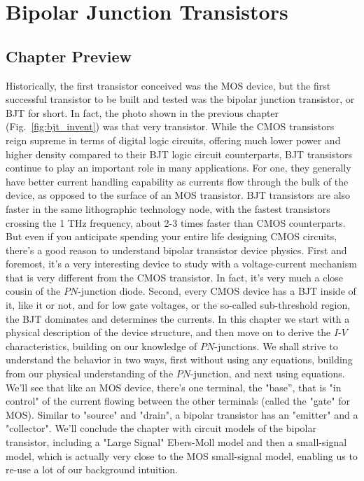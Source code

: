 \chapter{Bipolar Junction Transistors}
\label{ch:ch11_bjt}
\graphicspath{{./figs_bjt/}}
\section{Chapter Preview}
Historically, the first transistor conceived was the MOS device, but the first successful transistor to be built and tested was the bipolar junction transistor, or BJT for short.  In fact, the photo shown in the previous chapter (Fig.~\ref{fig:bjt_invent}) was that very transistor.  While the CMOS transistors reign supreme in terms of digital logic circuits, offering much lower power and higher density compared to their BJT logic circuit counterparts, BJT transistors continue to play an important role in many applications.  For one, they generally have better current handling capability as currents flow through the bulk of the device, as opposed to the surface of an MOS transistor.  BJT transistors are also faster in the same lithographic technology node, with the fastest transistors crossing the 1 THz frequency, about 2-3 times faster than CMOS counterparts.  But even if you anticipate spending your entire life designing CMOS circuits, there's a good reason to understand bipolar transistor device physics.  First and foremost, it's a very interesting device to study with a voltage-current mechanism that is very different from the CMOS transistor.  In fact, it's very much a close cousin of the $PN$-junction diode.  Second, every CMOS device has a BJT inside of it, like it or not, and for low gate voltages, or the so-called sub-threshold region, the BJT dominates and determines the currents.  
In this chapter we start with a physical description of the device structure, and then move on to derive the $I$-$V$ characteristics, building on our knowledge of $PN$-junctions. We shall strive to understand the behavior in two ways, first without using any equations, building from our physical understanding of the $PN$-junction, and next using equations.  We'll see that like an MOS device, there's one terminal, the "base'', that is "in control" of the current flowing between the other terminals (called the "gate" for MOS).  Similar to "source" and "drain", a bipolar transistor has an "emitter" and a "collector".   We'll conclude the chapter with circuit models of the bipolar transistor, including a "Large Signal" Ebers-Moll model and then a small-signal model, which is actually very close to the MOS small-signal model, enabling us to re-use a lot of our background intuition.
